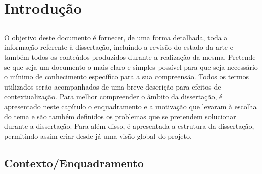 \chapter{Introdução} \label{chap:intro}

\section*{}

O objetivo deste documento é fornecer, de uma forma detalhada, toda a informação referente à dissertação, incluindo a revisão do estado da arte e também todos os conteúdos produzidos durante a realização da mesma. Pretende-se que seja um documento o mais claro e simples possível para que seja necessário o mínimo de conhecimento específico para a sua compreensão. Todos os termos utilizados serão acompanhados de uma breve descrição para efeitos de contextualização.
Para melhor compreender o âmbito da dissertação, é apresentado neste capítulo o enquadramento e a motivação que levaram à escolha do tema e são também definidos os problemas que se pretendem solucionar durante a dissertação. Para além disso, é apresentada a estrutura da dissertação, permitindo assim criar desde já uma visão global do projeto.

\section{Contexto/Enquadramento} \label{sec:context}

